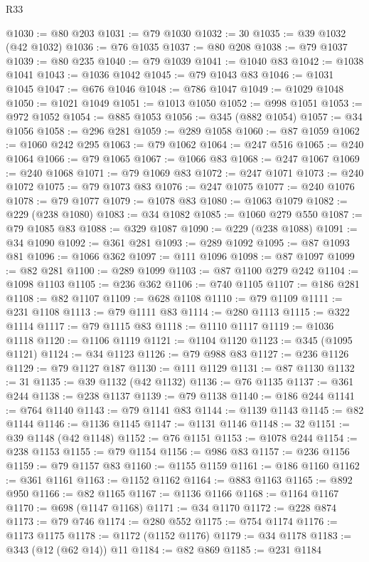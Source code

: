 \begin{lexlean}{R33}
\begin{coremodule}
@1030 := @80 @203
@1031 := @79 @1030
@1032 := 30
@1035 := @39 @1032 (@42 @1032)
@1036 := @76 @1035
@1037 := @80 @208
@1038 := @79 @1037
@1039 := @80 @235
@1040 := @79 @1039
@1041 := @1040 @83
@1042 := @1038 @1041
@1043 := @1036 @1042
@1045 := @79 @1043 @83
@1046 := @1031 @1045
@1047 := @676 @1046
@1048 := @786 @1047
@1049 := @1029 @1048
@1050 := @1021 @1049
@1051 := @1013 @1050
@1052 := @998 @1051
@1053 := @972 @1052
@1054 := @885 @1053
@1056 := @345 (@882 @1054)
@1057 := @34 @1056
@1058 := @296 @281
@1059 := @289 @1058
@1060 := @87 @1059
@1062 := @1060 @242 @295
@1063 := @79 @1062
@1064 := @247 @516
@1065 := @240 @1064
@1066 := @79 @1065
@1067 := @1066 @83
@1068 := @247 @1067
@1069 := @240 @1068
@1071 := @79 @1069 @83
@1072 := @247 @1071
@1073 := @240 @1072
@1075 := @79 @1073 @83
@1076 := @247 @1075
@1077 := @240 @1076
@1078 := @79 @1077
@1079 := @1078 @83
@1080 := @1063 @1079
@1082 := @229 (@238 @1080)
@1083 := @34 @1082
@1085 := @1060 @279 @550
@1087 := @79 @1085 @83
@1088 := @329 @1087
@1090 := @229 (@238 @1088)
@1091 := @34 @1090
@1092 := @361 @281
@1093 := @289 @1092
@1095 := @87 @1093 @81
@1096 := @1066 @362
@1097 := @111 @1096
@1098 := @87 @1097
@1099 := @82 @281
@1100 := @289 @1099
@1103 := @87 @1100 @279 @242
@1104 := @1098 @1103
@1105 := @236 @362
@1106 := @740 @1105
@1107 := @186 @281
@1108 := @82 @1107
@1109 := @628 @1108
@1110 := @79 @1109
@1111 := @231 @1108
@1113 := @79 @1111 @83
@1114 := @280 @1113
@1115 := @322 @1114
@1117 := @79 @1115 @83
@1118 := @1110 @1117
@1119 := @1036 @1118
@1120 := @1106 @1119
@1121 := @1104 @1120
@1123 := @345 (@1095 @1121)
@1124 := @34 @1123
@1126 := @79 @988 @83
@1127 := @236 @1126
@1129 := @79 @1127 @187
@1130 := @111 @1129
@1131 := @87 @1130
@1132 := 31
@1135 := @39 @1132 (@42 @1132)
@1136 := @76 @1135
@1137 := @361 @244
@1138 := @238 @1137
@1139 := @79 @1138
@1140 := @186 @244
@1141 := @764 @1140
@1143 := @79 @1141 @83
@1144 := @1139 @1143
@1145 := @82 @1144
@1146 := @1136 @1145
@1147 := @1131 @1146
@1148 := 32
@1151 := @39 @1148 (@42 @1148)
@1152 := @76 @1151
@1153 := @1078 @244
@1154 := @238 @1153
@1155 := @79 @1154
@1156 := @986 @83
@1157 := @236 @1156
@1159 := @79 @1157 @83
@1160 := @1155 @1159
@1161 := @186 @1160
@1162 := @361 @1161
@1163 := @1152 @1162
@1164 := @883 @1163
@1165 := @892 @950
@1166 := @82 @1165
@1167 := @1136 @1166
@1168 := @1164 @1167
@1170 := @698 (@1147 @1168)
@1171 := @34 @1170
@1172 := @228 @874
@1173 := @79 @746
@1174 := @280 @552
@1175 := @754 @1174
@1176 := @1173 @1175
@1178 := @1172 (@1152 @1176)
@1179 := @34 @1178
@1183 := @343 (@12 (@62 @14)) @11
@1184 := @82 @869
@1185 := @231 @1184

\end{coremodule}
\end{lexlean}
